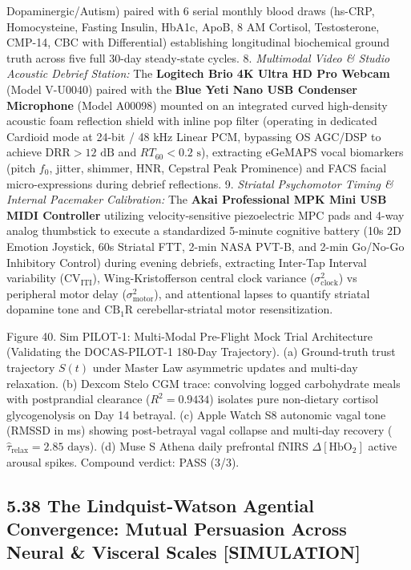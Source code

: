 \documentclass[
]{article}
\begin{document}
Dopaminergic/Autism) paired with 6 serial monthly blood draws (hs-CRP,
Homocysteine, Fasting Insulin, HbA1c, ApoB, 8 AM Cortisol, Testosterone,
CMP-14, CBC with Differential) establishing longitudinal biochemical
ground truth across five full 30-day steady-state cycles. 8.
\emph{Multimodal Video \& Studio Acoustic Debrief Station:} The
\textbf{Logitech Brio 4K Ultra HD Pro Webcam} (Model V-U0040) paired
with the \textbf{Blue Yeti Nano USB Condenser Microphone} (Model A00098)
mounted on an integrated curved high-density acoustic foam reflection
shield with inline pop filter (operating in dedicated Cardioid mode at
24-bit / 48 kHz Linear PCM, bypassing OS AGC/DSP to achieve
\(\text{DRR} > 12\text{ dB}\) and \(RT_{60} < 0.2\text{ s}\)),
extracting eGeMAPS vocal biomarkers (pitch \(f_0\), jitter, shimmer,
HNR, Cepstral Peak Prominence) and FACS facial micro-expressions during
debrief reflections. 9. \emph{Striatal Psychomotor Timing \& Internal
Pacemaker Calibration:} The \textbf{Akai Professional MPK Mini USB MIDI
Controller} utilizing velocity-sensitive piezoelectric MPC pads and
4-way analog thumbstick to execute a standardized 5-minute cognitive
battery (10s 2D Emotion Joystick, 60s Striatal FTT, 2-min NASA PVT-B,
and 2-min Go/No-Go Inhibitory Control) during evening debriefs,
extracting Inter-Tap Interval variability (\(\text{CV}_{\text{ITI}}\)),
Wing-Kristofferson central clock variance (\(\sigma^2_{\text{clock}}\))
vs peripheral motor delay (\(\sigma^2_{\text{motor}}\)), and attentional
lapses to quantify striatal dopamine tone and
\(\mathrm{CB}_1\mathrm{R}\) cerebellar-striatal motor resensitization.

Figure 40. Sim PILOT-1: Multi-Modal Pre-Flight Mock Trial Architecture
(Validating the DOCAS-PILOT-1 180-Day Trajectory). (a) Ground-truth
trust trajectory \(S(t)\) under Master Law asymmetric updates and
multi-day relaxation. (b) Dexcom Stelo CGM trace: convolving logged
carbohydrate meals with postprandial clearance (\(R^2 = 0.9434\))
isolates pure non-dietary cortisol glycogenolysis on Day 14 betrayal.
(c) Apple Watch S8 autonomic vagal tone (RMSSD in ms) showing
post-betrayal vagal collapse and multi-day recovery
(\(\hat{\tau}_{\mathrm{relax}} = 2.85\text{ days}\)). (d) Muse S Athena
daily prefrontal fNIRS \(\Delta [\mathrm{HbO}_2]\) active arousal
spikes. Compound verdict: PASS (3/3).

\subsection{5.38 The Lindquist-Watson Agential Convergence: Mutual
Persuasion Across Neural \& Visceral Scales
{[}SIMULATION{]}}\label{the-lindquist-watson-agential-convergence-mutual-persuasion-across-neural-visceral-scales-simulation}
\end{document}
